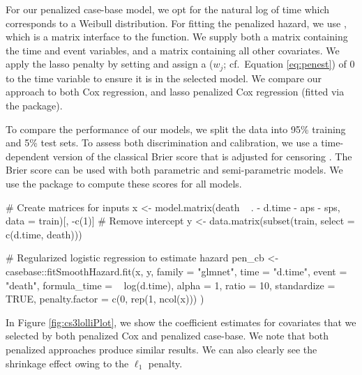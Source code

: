 For our penalized case-base model, we opt for the natural log of time
which corresponds to a Weibull distribution. For fitting the penalized
hazard, we use , which is a matrix interface
to the  function. We supply both a matrix 
containing the time and event variables, and a matrix 
containing all other covariates. We apply the lasso penalty by setting
 and assign a  (\(w_j\);
cf.~Equation \ref{eq:penest}) of 0 to the time variable to ensure it is
in the selected model. We compare our approach to both Cox regression,
and lasso penalized Cox regression (fitted via the 
package).

To compare the performance of our models, we split the data into 95\%
training and 5\% test sets. To assess both discrimination and
calibration, we use a time-dependent version of the classical Brier
score that is adjusted for censoring \citep{graf1999ass}. The Brier
score can be used with both parametric and semi-parametric models. We
use the  package to compute these scores for all
models.

\begin{Schunk}
\begin{Sinput}
# Create matrices for inputs
x <- model.matrix(death ~ . - d.time - aps - sps, 
                  data = train)[, -c(1)] # Remove intercept
y <- data.matrix(subset(train, select = c(d.time, death)))

# Regularized logistic regression to estimate hazard
pen_cb <- casebase::fitSmoothHazard.fit(x, y,
  family = "glmnet",
  time = "d.time", event = "death",
  formula_time = ~ log(d.time), alpha = 1,
  ratio = 10, standardize = TRUE,
  penalty.factor = c(0, rep(1, ncol(x)))
)
\end{Sinput}
\end{Schunk}

In Figure \ref{fig:cs3lolliPlot}, we show the coefficient estimates for
covariates that we selected by both penalized Cox and penalized
case-base. We note that both penalized approaches produce similar
results. We can also clearly see the shrinkage effect owing to the
\(\ell_1\) penalty.

